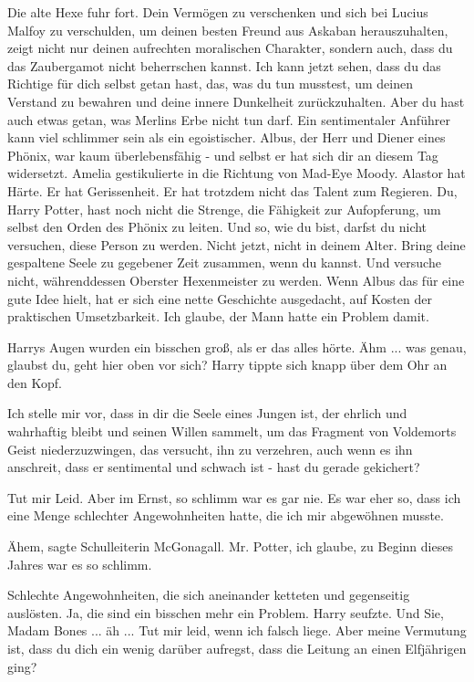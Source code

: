 Die alte Hexe fuhr fort. \glqq{}Dein Vermögen zu verschenken und sich bei Lucius
Malfoy zu verschulden, um deinen besten Freund aus Askaban herauszuhalten, zeigt
nicht nur deinen aufrechten moralischen Charakter, sondern auch, dass du das
Zaubergamot nicht beherrschen kannst. Ich kann jetzt sehen, dass du das Richtige
für dich selbst getan hast, das, was du tun musstest, um deinen Verstand zu
bewahren und deine innere Dunkelheit zurückzuhalten. Aber du hast auch etwas
getan, was Merlins Erbe nicht tun darf. Ein sentimentaler Anführer kann viel
schlimmer sein als ein egoistischer. Albus, der Herr und Diener eines Phönix,
war kaum überlebensfähig - und selbst er hat sich dir an diesem Tag widersetzt.\grqq{}
Amelia gestikulierte in die Richtung von Mad-Eye Moody. \glqq{}Alastor hat Härte.
Er hat Gerissenheit. Er hat trotzdem nicht das Talent zum Regieren. Du, Harry
Potter, hast noch nicht die Strenge, die Fähigkeit zur Aufopferung, um selbst
den Orden des Phönix zu leiten. Und so, wie du bist, darfst du nicht versuchen,
diese Person zu werden. Nicht jetzt, nicht in deinem Alter. Bring deine
gespaltene Seele zu gegebener Zeit zusammen, wenn du kannst. Und versuche nicht,
währenddessen Oberster Hexenmeister zu werden. Wenn Albus das für eine gute Idee
hielt, hat er sich eine nette Geschichte ausgedacht, auf Kosten der praktischen
Umsetzbarkeit. Ich glaube, der Mann hatte ein Problem damit.\grqq{}

Harrys Augen wurden ein bisschen groß, als er das alles hörte. \glqq{}Ähm ... was
genau, glaubst du, geht hier oben vor sich?\grqq{} Harry tippte sich knapp über dem
Ohr an den Kopf.

\glqq{}Ich stelle mir vor, dass in dir die Seele eines Jungen ist, der ehrlich
und wahrhaftig bleibt und seinen Willen sammelt, um das Fragment von Voldemorts
Geist niederzuzwingen, das versucht, ihn zu verzehren, auch wenn es ihn
anschreit, dass er sentimental und schwach ist - hast du gerade gekichert?\grqq{}

\glqq{}Tut mir Leid. Aber im Ernst, so schlimm war es gar nie. Es war eher so,
dass ich eine Menge schlechter Angewohnheiten hatte, die ich mir abgewöhnen
musste.\grqq{}

\glqq{}Ähem\grqq{}, sagte Schulleiterin McGonagall. \glqq{}Mr. Potter, ich glaube,
zu Beginn dieses Jahres war es so schlimm.\grqq{}

\glqq{}Schlechte Angewohnheiten, die sich aneinander ketteten und gegenseitig
auslösten. Ja, die sind ein bisschen mehr ein Problem.\grqq{} Harry seufzte. \glqq{}Und
Sie, Madam Bones ... äh ... Tut mir leid, wenn ich falsch liege. Aber meine
Vermutung ist, dass du dich ein wenig darüber aufregst, dass die Leitung an
einen Elfjährigen ging?\grqq{}

